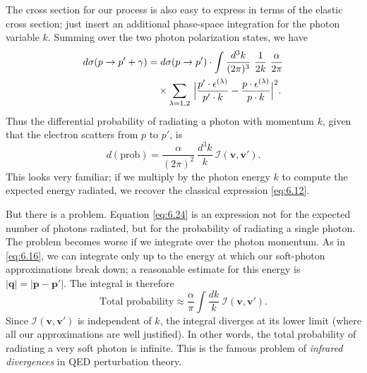 The cross section for our process is also easy to express in terms of the
elastic cross section; just insert an additional phase-space integration for
the photon variable $k$.  Summing over the two photon polarization states, we
have
\begin{equation}
  \begin{aligned}
    d\sigma(p\to p' + \gamma) &= d\sigma(p\to p')\cdot
      \int \frac{d^3k}{(2\pi)^3}\ \frac{1}{2k}\ \frac{\alpha}{2\pi}\\
    &\quad \times \sum_{\lambda=1,2}\ \Bigl|
      \frac{p'\cdot\epsilon^{(\lambda)}}{p'\cdot k}
      - \frac{p\cdot\epsilon^{(\lambda)}}{p\cdot k} \Bigr|^2 .
  \end{aligned}
  \label{eq:6.23}
\end{equation}
Thus the differential probability of radiating a photon with momentum $k$,
given that the electron scatters from $p$ to $p'$, is
\begin{equation}
  d(\mathrm{prob}) = \frac{\alpha}{(2\pi)^2}\ \frac{d^3k}{k}\
    \mathcal{I}(\mathbf{v},\mathbf{v}') .
  \label{eq:6.24}
\end{equation}
This looks very familiar; if we multiply by the photon energy $k$ to compute
the expected energy radiated, we recover the classical expression
\eqref{eq:6.12}.

But there is a problem.  Equation \eqref{eq:6.24} is an expression not for
the expected number of photons radiated, but for the probability of radiating
a single photon.  The problem becomes worse if we integrate over the photon
momentum.  As in \eqref{eq:6.16}, we can integrate only up to the energy at
which our soft-photon approximations break down; a reasonable estimate for
this energy is $|\mathbf{q}| = |\mathbf{p}-\mathbf{p}'|$.  The integral is
therefore
\begin{equation}
  \text{Total probability} \approx \frac{\alpha}{\pi}\int \frac{dk}{k}\
    \mathcal{I}(\mathbf{v}, \mathbf{v}') .
  \label{eq:6.25}
\end{equation}
Since $\mathcal{I}(\mathbf{v},\mathbf{v}')$ is independent of $k$, the
integral diverges at its lower limit (where all our approximations are well
justified).  In other words, the total probability of radiating a very soft
photon is infinite.  This is the famous problem of \emph{infrared divergences}
in QED perturbation theory.

